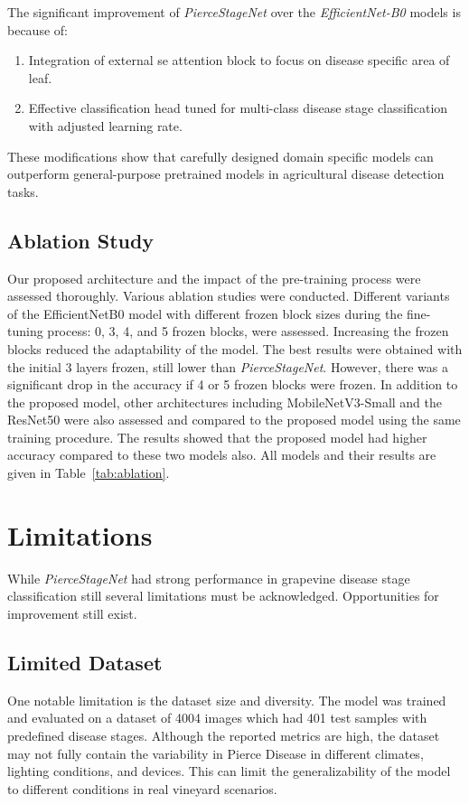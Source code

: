 \documentclass[conference]{IEEEtran}
\begin{document}
The significant improvement of \textit{PierceStageNet} over the \textit{EfficientNet-B0} models is because of:
\begin{enumerate}
	\item Integration of external \ac{se} attention block to focus on disease specific area of leaf.
	\item Effective classification head tuned for multi-class disease stage classification with adjusted learning rate.
\end{enumerate}

These modifications show that carefully designed domain specific models can outperform general-purpose pretrained models in agricultural disease detection tasks.

\subsection{Ablation Study}
Our proposed architecture and the impact of the pre-training process were assessed thoroughly. Various ablation studies were conducted. Different variants of the EfficientNetB0 model with different frozen block sizes during the fine-tuning process: 0, 3, 4, and 5 frozen blocks, were assessed. Increasing the frozen blocks reduced the adaptability of the model. The best results were obtained with the initial 3 layers frozen, still lower than \textit{PierceStageNet}. However, there was a significant drop in the accuracy if 4 or 5 frozen blocks were frozen. In addition to the proposed model, other architectures including MobileNetV3-Small and the ResNet50 were also assessed and compared to the proposed model using the same training procedure. The results showed that the proposed model had higher accuracy compared to these two models also. All models and their results are given in Table~\ref{tab:ablation}.

\section{Limitations}
\label{sec:limitations}
While \textit{PierceStageNet} had strong performance in grapevine disease stage classification still several limitations must be acknowledged. Opportunities for improvement still exist.

\subsection{Limited Dataset}
One notable limitation is the dataset size and diversity. The model was trained and evaluated on a dataset of 4004 images which had 401 test samples with predefined disease stages. Although the reported metrics are high, the dataset may not fully contain the variability in Pierce Disease in different climates, lighting conditions, and devices. This can limit the generalizability of the model to different conditions in real vineyard scenarios.
\end{document}
